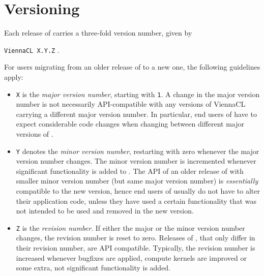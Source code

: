 
\chapter*{Versioning}  

Each release of {\ViennaCL} carries a three-fold version number, given by\\
\begin{center}
 \texttt{ViennaCL X.Y.Z} . \\
\end{center}
For users migrating from an older release of {\ViennaCL} to a new one, the
following guidelines apply:
\begin{itemize}
 \item \texttt{X} is the \emph{major version number}, starting with \texttt{1}.
A change in the major version number is not necessarily API-compatible with any
versions of ViennaCL carrying a different major version number. In particular,
end users of {\ViennaCL} have to expect considerable code changes when changing
between different major versions of {\ViennaCL}.

 \item \texttt{Y} denotes the \emph{minor version number}, restarting with zero
whenever the major version number changes. The minor version number is
incremented whenever significant functionality is added to {\ViennaCL}.
The API of an older release of {\ViennaCL} with smaller minor version number
(but same major version number) is \emph{essentially} compatible to the new
version, hence end users of {\ViennaCL} usually do not have to alter their
application code, unless they have used a certain functionality that was not
intended to be used and removed in the new version.

 \item \texttt{Z} is the \emph{revision number}. If either the major or the
minor version number changes, the revision number is reset to zero. Releases of
{\ViennaCL}, that only differ in their revision number, are API compatible.
Typically, the revision number is increased whenever bugfixes are applied,
compute kernels are improved or some extra, not significant functionality is
added.
\end{itemize}

